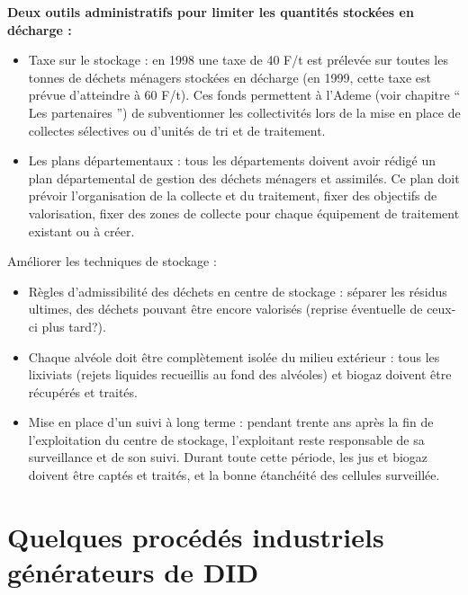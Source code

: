\vspace{0.3cm}
\textbf{Deux outils administratifs pour limiter les quantités stockées en décharge :}
\vspace{0.3cm}

\begin{itemize}

\item Taxe sur le stockage : en 1998 une taxe de 40 F/t est prélevée sur toutes les tonnes de déchets ménagers stockées en décharge (en 1999, cette taxe est prévue d’atteindre à 60 F/t). Ces fonds permettent à l’Ademe (voir chapitre “ Les partenaires ”) de subventionner les collectivités lors de la mise en place de collectes sélectives ou d’unités de tri et de traitement.
\item Les plans départementaux : tous les départements doivent avoir rédigé un plan départemental de gestion des déchets ménagers et assimilés. Ce plan doit prévoir l’organisation de la collecte et du traitement, fixer des objectifs de valorisation, fixer des zones de collecte pour chaque équipement de traitement existant ou à créer.
\end{itemize}

Améliorer les techniques de stockage :
\begin{itemize}

 \item Règles d’admissibilité des déchets en centre de stockage : séparer les résidus ultimes, des déchets pouvant être encore valorisés (reprise éventuelle de ceux-ci plus tard?).

\item Chaque alvéole doit être complètement isolée du milieu extérieur : tous les lixiviats (rejets liquides recueillis au fond des alvéoles) et biogaz doivent être récupérés et traités.

\item Mise en place d’un suivi à long terme : pendant trente ans après la fin de l’exploitation du centre de stockage, l’exploitant reste responsable de sa surveillance et de son suivi. 
Durant toute cette période, les jus et biogaz doivent être captés et traités, et la bonne étanchéité des cellules surveillée.

\end{itemize}
 
\section{Quelques procédés industriels générateurs de DID}


